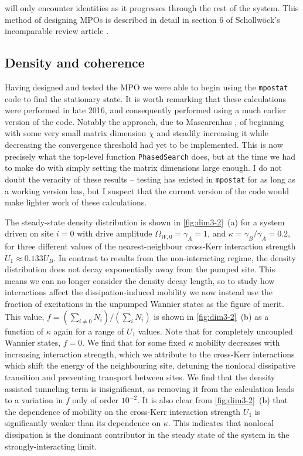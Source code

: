 will only encounter identities as it progresses through the rest of the system. This method of designing MPOs is described in detail in section 6 of Schollw\"{o}ck's incomparable review article \cite{Schollwock2011}.

\subsection{Density and coherence}
Having designed and tested the MPO we were able to begin using the \lstinline$mpostat$ code to find the stationary state. It is worth remarking that these calculations were performed in late 2016, and consequently performed using a much earlier version of the code. Notably the approach, due to Mascarenhas \cite{Mascarenhas2015}, of beginning with some very small matrix dimension \(\chi\) and steadily increasing it while decreasing the convergence threshold had yet to be implemented. This is now precisely what the top-level function \lstinline$PhasedSearch$ does, but at the time we had to make do with simply setting the matrix dimensions large enough. I do not doubt the veracity of these results -- testing has existed in \lstinline$mpostat$ for as long as a working version has, but I suspect that the current version of the code would make lighter work of these calculations.

The steady-state density distribution is shown in \cref{fig:dim3-2}~(a) for a system driven on site \(i=0\) with drive amplitude \(\Omega_{W,0} = \gamma_{A} = 1\), and \(\kappa = \gamma_{B}/\gamma_{A} = 0.2\), for three different values of the nearest-neighbour cross-Kerr interaction strength \(U_{1} \approx 0.133U_{B}\). In contrast to results from the non-interacting regime, the density distribution does not decay exponentially away from the pumped site. This means we can no longer consider the density decay length, so to study how interactions affect the dissipation-induced mobility we now instead use the fraction of excitations in the unpumped Wannier states as the figure of merit. This value, \(f = (\sum_{i \neq 0} N_{i}) / (\sum_{i} N_{i})\) is shown in \cref{fig:dim3-2}~(b) as a function of \(\kappa\) again for a range of \(U_{1}\) values. Note that for completely uncoupled Wannier states, \(f=0\). We find that for some fixed \(\kappa\) mobility decreases with increasing interaction strength, which we attribute to the cross-Kerr interactions which shift the energy of the neighbouring site, detuning the nonlocal dissipative transition and preventing transport between sites. We find that the density assisted tunneling term is insignificant, as removing it from the calculation leads to a variation in \(f\) only of order \(10^{-2}\). It is also clear from \cref{fig:dim3-2}~(b) that the dependence of mobility on the cross-Kerr interaction strength \(U_{1}\) is significantly weaker than its dependence on \(\kappa\). This indicates that nonlocal dissipation is the dominant contributor in the steady state of the system in the strongly-interacting limit. 

